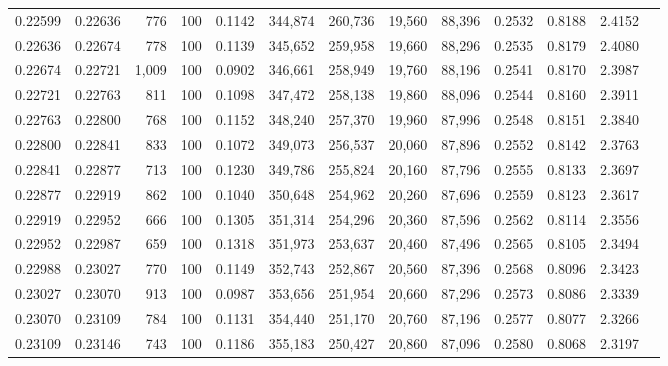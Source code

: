 \begin{tabular}{rrrrrrrrrrrrr}
0.22599 & 0.22636 &   776 & 100 &                                     0.1142 & 344,874 & 260,736 &  19,560 &  88,396 & 0.2532 & 0.8188 & 2.4152 \\
0.22636 & 0.22674 &   778 & 100 &                                     0.1139 & 345,652 & 259,958 &  19,660 &  88,296 & 0.2535 & 0.8179 & 2.4080 \\
0.22674 & 0.22721 & 1,009 & 100 &                                     0.0902 & 346,661 & 258,949 &  19,760 &  88,196 & 0.2541 & 0.8170 & 2.3987 \\
0.22721 & 0.22763 &   811 & 100 &                                     0.1098 & 347,472 & 258,138 &  19,860 &  88,096 & 0.2544 & 0.8160 & 2.3911 \\
0.22763 & 0.22800 &   768 & 100 &                                     0.1152 & 348,240 & 257,370 &  19,960 &  87,996 & 0.2548 & 0.8151 & 2.3840 \\
0.22800 & 0.22841 &   833 & 100 &                                     0.1072 & 349,073 & 256,537 &  20,060 &  87,896 & 0.2552 & 0.8142 & 2.3763 \\
0.22841 & 0.22877 &   713 & 100 &                                     0.1230 & 349,786 & 255,824 &  20,160 &  87,796 & 0.2555 & 0.8133 & 2.3697 \\
0.22877 & 0.22919 &   862 & 100 &                                     0.1040 & 350,648 & 254,962 &  20,260 &  87,696 & 0.2559 & 0.8123 & 2.3617 \\
0.22919 & 0.22952 &   666 & 100 &                                     0.1305 & 351,314 & 254,296 &  20,360 &  87,596 & 0.2562 & 0.8114 & 2.3556 \\
0.22952 & 0.22987 &   659 & 100 &                                     0.1318 & 351,973 & 253,637 &  20,460 &  87,496 & 0.2565 & 0.8105 & 2.3494 \\
0.22988 & 0.23027 &   770 & 100 &                                     0.1149 & 352,743 & 252,867 &  20,560 &  87,396 & 0.2568 & 0.8096 & 2.3423 \\
0.23027 & 0.23070 &   913 & 100 &                                     0.0987 & 353,656 & 251,954 &  20,660 &  87,296 & 0.2573 & 0.8086 & 2.3339 \\
0.23070 & 0.23109 &   784 & 100 &                                     0.1131 & 354,440 & 251,170 &  20,760 &  87,196 & 0.2577 & 0.8077 & 2.3266 \\
0.23109 & 0.23146 &   743 & 100 &                                     0.1186 & 355,183 & 250,427 &  20,860 &  87,096 & 0.2580 & 0.8068 & 2.3197 \\

\end{tabular}
